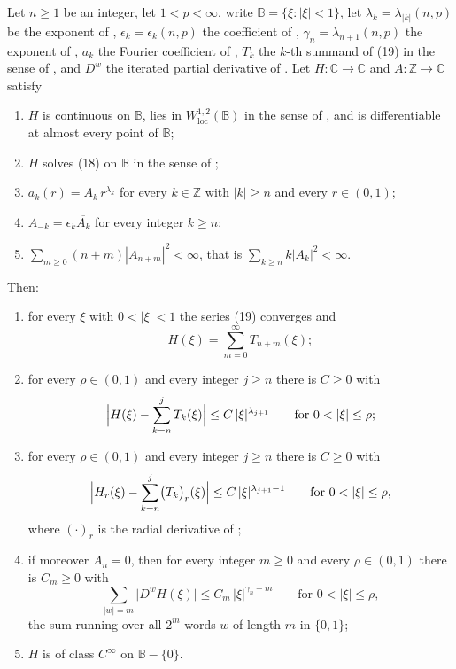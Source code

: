 \begin{lemma}
Let $n\ge1$ be an integer, let $1<p<\infty$, write $\mathbb{B}=\{\xi:|\xi|<1\}$,
let $\lambda_k=\lambda_{|k|}(n,p)$ be the exponent of ,
$\epsilon_k=\epsilon_k(n,p)$ the coefficient of ,
$\gamma_n=\lambda_{n+1}(n,p)$ the exponent of , $a_k$ the
Fourier coefficient of , $T_k$ the $k$-th summand of
(19) in the sense of , and $D^{w}$ the iterated partial
derivative of .  Let $H\colon\mathbb{C}\to\mathbb{C}$ and
$A\colon\mathbb{Z}\to\mathbb{C}$ satisfy
\begin{enumerate}
\item[(H1)] $H$ is continuous on $\mathbb{B}$, lies in
  $W^{1,2}_{\mathrm{loc}}(\mathbb{B})$ in the sense of ,
  and is differentiable at almost every point of $\mathbb{B}$;
\item[(H2)] $H$ solves (18) on $\mathbb{B}$ in the sense of
  ;
\item[(H3)] $a_k(r)=A_k\,r^{\lambda_k}$ for every $k\in\mathbb{Z}$ with
  $|k|\ge n$ and every $r\in(0,1)$;
\item[(H4)] $A_{-k}=\epsilon_k\overline{A_k}$ for every integer $k\ge n$;
\item[(H5)] $\sum_{m\ge0}(n+m)|A_{n+m}|^2<\infty$, that is
  $\sum_{k\ge n}k|A_k|^2<\infty$.
\end{enumerate}
Then:
\begin{enumerate}
\item[(a)] for every $\xi$ with $0<|\xi|<1$ the series (19) converges and
\[
  H(\xi)=\sum_{m=0}^{\infty}T_{n+m}(\xi);
\]
\item[(b)] for every $\rho\in(0,1)$ and every integer $j\ge n$ there is
$C\ge0$ with
\[
  \Bigl|H(\xi)-\sum_{k=n}^{j}T_k(\xi)\Bigr|\le C\,|\xi|^{\lambda_{j+1}}
  \qquad\text{for }0<|\xi|\le\rho ;
\]
\item[(c)] for every $\rho\in(0,1)$ and every integer $j\ge n$ there is
$C\ge0$ with
\[
  \Bigl|H_r(\xi)-\sum_{k=n}^{j}\bigl(T_k\bigr)_r(\xi)\Bigr|
  \le C\,|\xi|^{\lambda_{j+1}-1}
  \qquad\text{for }0<|\xi|\le\rho ,
\]
where $(\cdot)_r$ is the radial derivative of ;
\item[(d)] if moreover $A_n=0$, then for every integer $m\ge0$ and every
$\rho\in(0,1)$ there is $C_m\ge0$ with
\[
  \sum_{|w|=m}\bigl|D^{w}H(\xi)\bigr|\le C_m\,|\xi|^{\gamma_n-m}
  \qquad\text{for }0<|\xi|\le\rho ,
\]
the sum running over all $2^m$ words $w$ of length $m$ in $\{0,1\}$;
\item[(e)] $H$ is of class $C^\infty$ on $\mathbb{B}-\{0\}$.
\end{enumerate}


\end{lemma}
